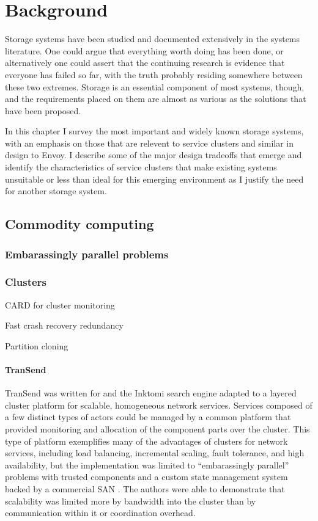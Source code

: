 \chapter{Background}

Storage systems have been studied and documented extensively in the systems literature. One could argue that everything worth doing has been done, or alternatively one could assert that the continuing research is evidence that everyone has failed so far, with the truth probably residing somewhere between these two extremes. Storage is an essential component of most systems, though, and the requirements placed on them are almost as various as the solutions that have been proposed.

In this chapter I survey the most important and widely known storage systems, with an emphasis on those that are relevent to service clusters and similar in design to Envoy. I describe some of the major design tradeoffs that emerge and identify the characteristics of service clusters that make existing systems unsuitable or less than ideal for this emerging environment as I justify the need for another storage system.

\section{Commodity computing}

\subsection{Embarassingly parallel problems}

\subsection{Clusters}
CARD for cluster monitoring\cite{anderson97}

Fast crash recovery \vs redundancy\cite{baker94}

Partition cloning \cite{rauch}

\subsubsection{TranSend}

TranSend was written for and the Inktomi search engine adapted to a layered cluster platform for scalable, homogeneous network services. Services composed of a few distinct types of actors could be managed by a common platform that provided monitoring and allocation of the component parts over the cluster. This type of platform exemplifies many of the advantages of clusters for network services, including load balancing, incremental scaling, fault tolerance, and high availability, but the implementation was limited to ``embarassingly parallel'' problems with trusted components and a custom state management system backed by a commercial SAN \cite{fox}. The authors were able to demonstrate that scalability was limited more by bandwidth into the cluster than by communication within it or coordination overhead.

